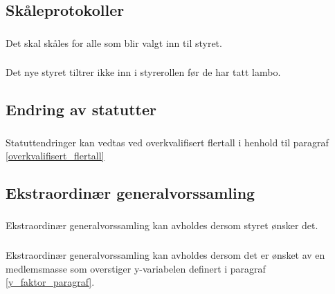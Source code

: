 \documentclass{article}
\newenvironment{statute}[1][]
    {
        \titleformat{\subsubsection}[runin]{\normalfont}{\hspace{1pt}\textit{\S\hspace{5pt}\thesubsubsection}}{0pt}{\rule{4pt}{0pt}}{}
        \subsubsection{}#1
        \begin{minipage}[t]{0.9\linewidth}
    }
    {
        \end{minipage}
        
        \ignorespacesafterend
    }
\begin{document}
        \subsection{Skåleprotokoller}
            \begin{statute}
                Det skal skåles for alle som blir valgt inn til styret.
            \end{statute}
            \begin{statute}
                Det nye styret tiltrer ikke inn i styrerollen før de har tatt lambo.
            \end{statute}            
        \subsection{Endring av statutter}
            \begin{statute}
                Statuttendringer kan vedtas ved overkvalifisert flertall i henhold til paragraf  \ref{overkvalifisert_flertall}
            \end{statute}
            
        \subsection{Ekstraordinær generalvorssamling}
            \begin{statute}
                Ekstraordinær generalvorssamling kan avholdes dersom styret ønsker det.
            \end{statute}
            \begin{statute}
                Ekstraordinær generalvorssamling kan avholdes dersom det er ønsket av en medlemsmasse som overstiger y-variabelen definert i paragraf \ref{y_faktor_paragraf}.
            \end{statute}
\end{document}
